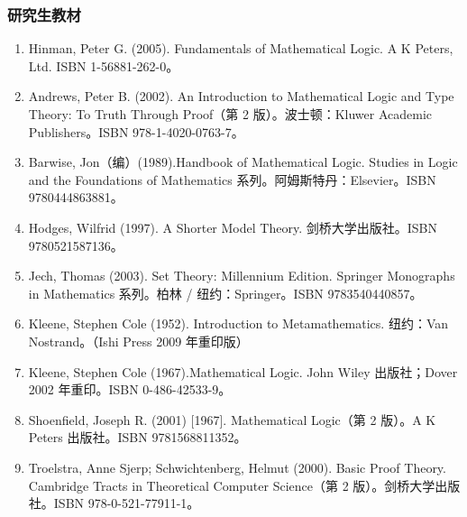 \subsubsection{研究生教材}
\begin{enumerate}
  \item Hinman, Peter G. (2005). Fundamentals of Mathematical Logic. A K Peters, Ltd. ISBN 1-56881-262-0。
  \item Andrews, Peter B. (2002). An Introduction to Mathematical Logic and Type Theory: To Truth Through Proof（第 2 版）。波士顿：Kluwer Academic Publishers。ISBN 978-1-4020-0763-7。
  \item Barwise, Jon（编）(1989).Handbook of Mathematical Logic. Studies in Logic and the Foundations of Mathematics 系列。阿姆斯特丹：Elsevier。ISBN 9780444863881。
  \item Hodges, Wilfrid (1997). A Shorter Model Theory. 剑桥大学出版社。ISBN 9780521587136。
  \item Jech, Thomas (2003). Set Theory: Millennium Edition. Springer Monographs in Mathematics 系列。柏林 / 纽约：Springer。ISBN 9783540440857。
  \item Kleene, Stephen Cole (1952). Introduction to Metamathematics. 纽约：Van Nostrand。（Ishi Press 2009 年重印版）
  \item Kleene, Stephen Cole (1967).Mathematical Logic. John Wiley 出版社；Dover 2002 年重印。ISBN 0-486-42533-9。
  \item Shoenfield, Joseph R. (2001) [1967]. Mathematical Logic（第 2 版）。A K Peters 出版社。ISBN 9781568811352。
  \item Troelstra, Anne Sjerp; Schwichtenberg, Helmut (2000). Basic Proof Theory. Cambridge Tracts in Theoretical Computer Science（第 2 版）。剑桥大学出版社。ISBN 978-0-521-77911-1。
\end{enumerate}
